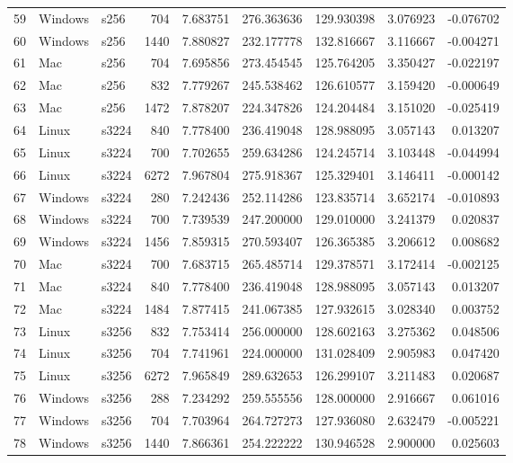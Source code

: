 \documentclass{IEEEtran}
\begin{document}
\begin{longtable}{rllrrrrrr}
  59 & Windows & s256 &     704 & 7.683751 & 276.363636 & 129.930398 & 3.076923 & -0.076702 \\ 
  60 & Windows & s256 &    1440 & 7.880827 & 232.177778 & 132.816667 & 3.116667 & -0.004271 \\ 
  61 & Mac & s256 &     704 & 7.695856 & 273.454545 & 125.764205 & 3.350427 & -0.022197 \\ 
  62 & Mac & s256 &     832 & 7.779267 & 245.538462 & 126.610577 & 3.159420 & -0.000649 \\ 
  63 & Mac & s256 &    1472 & 7.878207 & 224.347826 & 124.204484 & 3.151020 & -0.025419 \\ 
  64 & Linux & s3224 &     840 & 7.778400 & 236.419048 & 128.988095 & 3.057143 & 0.013207 \\ 
  65 & Linux & s3224 &     700 & 7.702655 & 259.634286 & 124.245714 & 3.103448 & -0.044994 \\ 
  66 & Linux & s3224 &    6272 & 7.967804 & 275.918367 & 125.329401 & 3.146411 & -0.000142 \\ 
  67 & Windows & s3224 &     280 & 7.242436 & 252.114286 & 123.835714 & 3.652174 & -0.010893 \\ 
  68 & Windows & s3224 &     700 & 7.739539 & 247.200000 & 129.010000 & 3.241379 & 0.020837 \\ 
  69 & Windows & s3224 &    1456 & 7.859315 & 270.593407 & 126.365385 & 3.206612 & 0.008682 \\ 
  70 & Mac & s3224 &     700 & 7.683715 & 265.485714 & 129.378571 & 3.172414 & -0.002125 \\ 
  71 & Mac & s3224 &     840 & 7.778400 & 236.419048 & 128.988095 & 3.057143 & 0.013207 \\ 
  72 & Mac & s3224 &    1484 & 7.877415 & 241.067385 & 127.932615 & 3.028340 & 0.003752 \\ 
  73 & Linux & s3256 &     832 & 7.753414 & 256.000000 & 128.602163 & 3.275362 & 0.048506 \\ 
  74 & Linux & s3256 &     704 & 7.741961 & 224.000000 & 131.028409 & 2.905983 & 0.047420 \\ 
  75 & Linux & s3256 &    6272 & 7.965849 & 289.632653 & 126.299107 & 3.211483 & 0.020687 \\ 
  76 & Windows & s3256 &     288 & 7.234292 & 259.555556 & 128.000000 & 2.916667 & 0.061016 \\ 
  77 & Windows & s3256 &     704 & 7.703964 & 264.727273 & 127.936080 & 2.632479 & -0.005221 \\ 
  78 & Windows & s3256 &    1440 & 7.866361 & 254.222222 & 130.946528 & 2.900000 & 0.025603 \\ 

\end{longtable}
\end{document}
